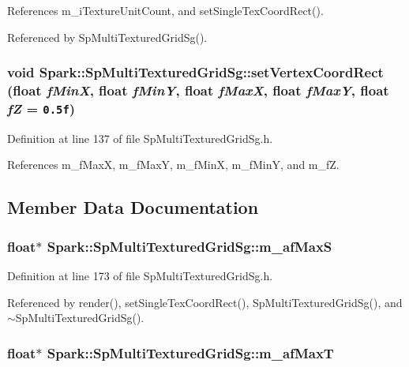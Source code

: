 References m\_\-i\-Texture\-Unit\-Count, and set\-Single\-Tex\-Coord\-Rect().

Referenced by Sp\-Multi\-Textured\-Grid\-Sg().
\subsubsection{\setlength{\rightskip}{0pt plus 5cm}void Spark::Sp\-Multi\-Textured\-Grid\-Sg::set\-Vertex\-Coord\-Rect (float {\em f\-Min\-X}, float {\em f\-Min\-Y}, float {\em f\-Max\-X}, float {\em f\-Max\-Y}, float {\em f\-Z} = {\tt 0.5f})\hspace{0.3cm}{\tt  [inline]}}\label{classSpark_1_1SpMultiTexturedGridSg_a5}


Definition at line 137 of file Sp\-Multi\-Textured\-Grid\-Sg.h.

References m\_\-f\-Max\-X, m\_\-f\-Max\-Y, m\_\-f\-Min\-X, m\_\-f\-Min\-Y, and m\_\-f\-Z.

\subsection{Member Data Documentation}
\subsubsection{\setlength{\rightskip}{0pt plus 5cm}float$\ast$ {\bf Spark::Sp\-Multi\-Textured\-Grid\-Sg::m\_\-af\-Max\-S}\hspace{0.3cm}{\tt  [protected]}}\label{classSpark_1_1SpMultiTexturedGridSg_p9}


Definition at line 173 of file Sp\-Multi\-Textured\-Grid\-Sg.h.

Referenced by render(), set\-Single\-Tex\-Coord\-Rect(), Sp\-Multi\-Textured\-Grid\-Sg(), and $\sim$Sp\-Multi\-Textured\-Grid\-Sg().
\subsubsection{\setlength{\rightskip}{0pt plus 5cm}float$\ast$ {\bf Spark::Sp\-Multi\-Textured\-Grid\-Sg::m\_\-af\-Max\-T}\hspace{0.3cm}{\tt  [protected]}}\label{classSpark_1_1SpMultiTexturedGridSg_p11}


